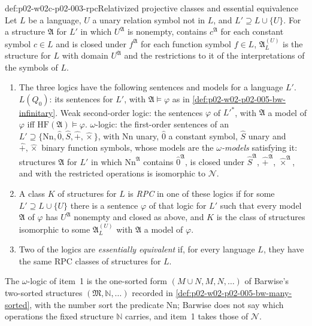 \begin{hbconvention}{def:p02-w02c-p02-003-rpc}{Relativized projective classes and essential equivalence}
Let \(L\) be a language, \(U\) a unary relation symbol not in \(L\), and
\(L'\supseteq L\cup\{U\}\).  For a structure \(\mathfrak A\) for \(L'\) in
which \(U^{\mathfrak A}\) is nonempty, contains \(c^{\mathfrak A}\) for each
constant symbol \(c\in L\) and is closed under \(f^{\mathfrak A}\) for each
function symbol \(f\in L\), \(\mathfrak A^{(U)}_{L}\) is the structure for
\(L\) with domain \(U^{\mathfrak A}\) and the restrictions to it of the
interpretations of the symbols of \(L\).
\begin{enumerate}
\item The three logics have the following sentences and models for a
      language \(L'\).  \(L(Q_0)\): its sentences for \(L'\), with
      \(\mathfrak A\models\varphi\) as in
      \cref{def:p02-w02-p02-005-bw-infinitary}.  Weak second-order logic:
      the sentences \(\varphi\) of \(L'^{*}\), with \(\mathfrak A\) a model
      of \(\varphi\) iff \(\mathrm{HF}(\mathfrak A)\models\varphi\).
      \(\omega\)-logic: the first-order sentences of an
      \(L'\supseteq\{\mathrm{Nn},\hat0,\hat S,\hat+,\hat\times\}\), with
      \(\mathrm{Nn}\) unary, \(\hat0\) a constant symbol, \(\hat S\) unary and
      \(\hat+,\hat\times\) binary function symbols, whose models are the
      \emph{\(\omega\)-models} satisfying it: structures \(\mathfrak A\)
      for \(L'\) in which \(\mathrm{Nn}^{\mathfrak A}\) contains
      \(\hat0^{\mathfrak A}\), is closed under \(\hat S^{\mathfrak A}\),
      \(\hat+^{\mathfrak A}\), \(\hat\times^{\mathfrak A}\), and with the
      restricted operations is isomorphic to \(\mathcal N\).
\item A class \(K\) of structures for \(L\) is \emph{RPC} in one of these
      logics if for some \(L'\supseteq L\cup\{U\}\) there is a sentence
      \(\varphi\) of that logic for \(L'\) such that every model
      \(\mathfrak A\) of \(\varphi\) has \(U^{\mathfrak A}\) nonempty and
      closed as above, and \(K\) is the class of structures isomorphic to
      some \(\mathfrak A^{(U)}_{L}\) with \(\mathfrak A\) a model of
      \(\varphi\).
\item Two of the logics are \emph{essentially equivalent} if, for every
      language \(L\), they have the same RPC classes of structures for
      \(L\).
\end{enumerate}
The \(\omega\)-logic of item~1 is the one-sorted form
\((M\cup N,M,N,\ldots)\) of Barwise's two-sorted structures
\((\mathfrak M,\mathbb N,\ldots)\) recorded in
\cref{def:p02-w02-p02-005-bw-many-sorted}, with the number sort the
predicate \(\mathrm{Nn}\); Barwise does not say which operations the fixed
structure \(\mathbb N\) carries, and item~1 takes those of \(\mathcal N\).
\end{hbconvention}

